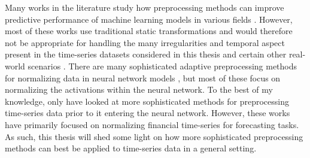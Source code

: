 \documentclass{statsmsc}
\begin{document}
{%

\clearpage
Many works in the literature study how preprocessing methods can improve predictive performance
of machine learning models in various fields
\citep{preprocess_origin,nawi,singh,dain,bin,mixture_ct}. However, most of these works
\citep{preprocess_origin,nawi,singh,mixture_ct} use traditional static transformations
and would therefore not be appropriate for handling the many irregularities and temporal
aspect present in the  time-series datasets considered in this thesis and certain other
real-world scenarios \citep{nawi,dain,rdain,bin}.
There are many sophisticated adaptive preprocessing methods
for normalizing data in neural network models \citep{huang2020,yu2022,batchnorm}, but most
of these focus on normalizing the activations within the neural network.
To the best of my knowledge, only \cite{dain,rdain,bin} have looked at more sophisticated
methods for preprocessing time-series data prior to it entering the neural network.
However, these works have primarily focused on normalizing financial time-series for
forecasting tasks. As such, this thesis will shed some light on how more sophisticated
preprocessing methods can best be applied to time-series data in a general setting.

}
\end{document}
